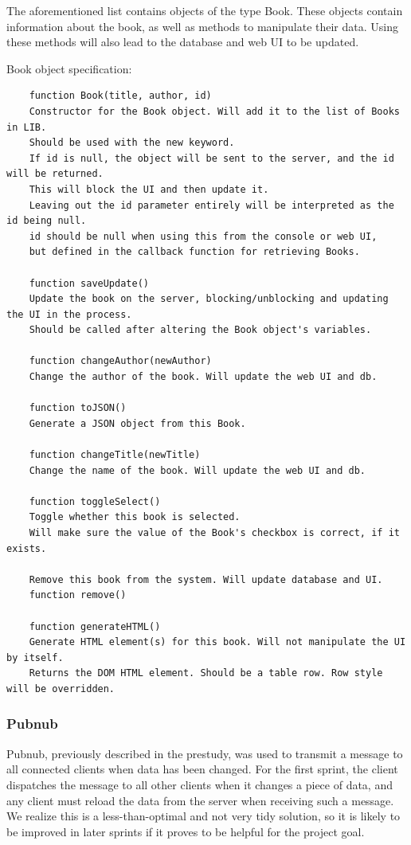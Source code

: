 The aforementioned list contains objects of the type Book. These objects contain information about the book, as well as methods to manipulate their data. Using these methods will also lead to the database and web UI to be updated.

Book object specification:
\begin{verbatim}
    function Book(title, author, id)
    Constructor for the Book object. Will add it to the list of Books in LIB. 
    Should be used with the new keyword.
    If id is null, the object will be sent to the server, and the id will be returned. 
    This will block the UI and then update it.
    Leaving out the id parameter entirely will be interpreted as the id being null.
    id should be null when using this from the console or web UI, 
    but defined in the callback function for retrieving Books.
    
    function saveUpdate()
    Update the book on the server, blocking/unblocking and updating the UI in the process.
    Should be called after altering the Book object's variables.
    
    function changeAuthor(newAuthor)
    Change the author of the book. Will update the web UI and db.
    
    function toJSON()
    Generate a JSON object from this Book.

    function changeTitle(newTitle)
    Change the name of the book. Will update the web UI and db.

    function toggleSelect()
    Toggle whether this book is selected. 
    Will make sure the value of the Book's checkbox is correct, if it exists.
    
    Remove this book from the system. Will update database and UI.
    function remove()

    function generateHTML()
    Generate HTML element(s) for this book. Will not manipulate the UI by itself.
    Returns the DOM HTML element. Should be a table row. Row style will be overridden.
\end{verbatim}


\subsubsection{Pubnub}
Pubnub, previously described in the prestudy, was used to transmit a message to all connected clients when data has been changed. For the first sprint, the client dispatches the message to all other clients when it changes a piece of data, and any client must reload the data from the server when receiving such a message. We realize this is a less-than-optimal and not very tidy solution, so it is likely to be improved in later sprints if it proves to be helpful for the project goal.

